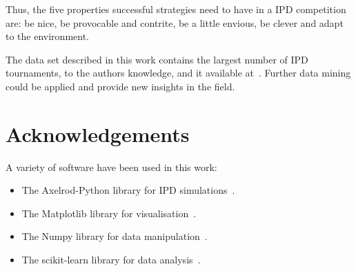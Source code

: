 \documentclass{article}
\begin{document}
Thus, the five properties successful strategies need to have in a IPD competition
are: be nice, be provocable and contrite, be a little envious, be clever and adapt to the
environment.

The data set described in this work contains the largest number of IPD tournaments,
to the authors knowledge, and it available at~\cite{data}. Further data mining
could be applied and provide new insights in the field.




\section{Acknowledgements}

A variety of software have been used in this work:

\begin{itemize}
    \item The Axelrod-Python library for IPD simulations~\cite{axelrodproject}.
    \item The Matplotlib library for visualisation~\cite{hunter2007matplotlib}.
    \item The Numpy library for data manipulation~\cite{walt2011numpy}.
    \item The scikit-learn library for data analysis~\cite{scikit-learn}.
\end{itemize}

\appendix





\end{document}
